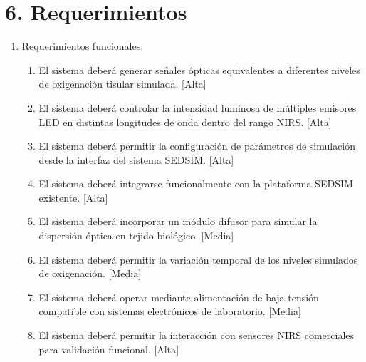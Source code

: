 \documentclass[
11pt, %
]{charter}
\begin{document}

\section{6. Requerimientos}
\label{sec:requerimientos}

\begin{enumerate}

	\item Requerimientos funcionales:
	\begin{enumerate}
	
		\item El sistema deberá generar señales ópticas equivalentes a diferentes niveles de oxigenación tisular simulada. [Alta]
		
		\item El sistema deberá controlar la intensidad luminosa de múltiples emisores LED en distintas longitudes de onda dentro del rango NIRS. [Alta]
		
		\item El sistema deberá permitir la configuración de parámetros de simulación desde la interfaz del sistema SEDSIM. [Alta]
		
		\item El sistema deberá integrarse funcionalmente con la plataforma SEDSIM existente. [Alta]
		
		\item El sistema deberá incorporar un módulo difusor para simular la dispersión óptica en tejido biológico. [Media]
		
		\item El sistema deberá permitir la variación temporal de los niveles simulados de oxigenación. [Media]
		
		\item El sistema deberá operar mediante alimentación de baja tensión compatible con sistemas electrónicos de laboratorio. [Media]
		
		\item El sistema deberá permitir la interacción con sensores NIRS comerciales para validación funcional. [Alta]
		

\end{enumerate}
\end{enumerate}
\end{document}
